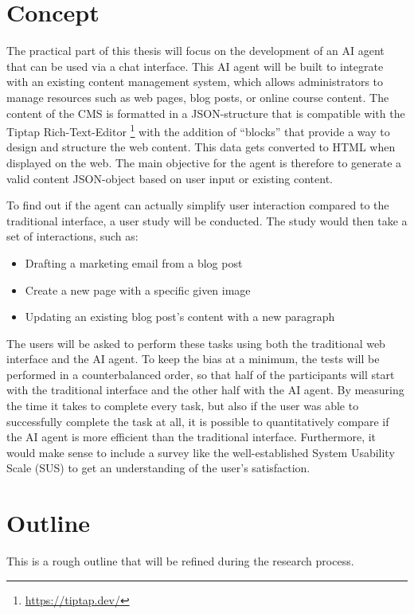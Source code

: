 \documentclass[12pt,a4paper]{article}
\begin{document}
\section*{Concept}
The practical part of this thesis will focus on the development of an AI agent that can be used via a chat interface.
This AI agent will be built to integrate with an existing content management system, which allows administrators to manage resources such as web pages, blog posts, or online course content.
The content of the CMS is formatted in a JSON-structure that is compatible with the Tiptap Rich-Text-Editor \footnote{\url{https://tiptap.dev/}} with the addition of “blocks” that provide a way to design and structure the web content.
This data gets converted to HTML when displayed on the web.
The main objective for the agent is therefore to generate a valid content JSON-object based on user input or existing content.

To find out if the agent can actually simplify user interaction compared to the traditional interface, a user study will be conducted. The study would then take a set of interactions, such as:

\begin{itemize}
	\item Drafting a marketing email from a blog post
	\item Create a new page with a specific given image
	\item Updating an existing blog post's content with a new paragraph
\end{itemize}

The users will be asked to perform these tasks using both the traditional web interface and the AI agent. To keep the bias at a minimum, the tests will be performed in a counterbalanced order, so that half of the participants will start with the traditional interface and the other half with the AI agent.
By measuring the time it takes to complete every task, but also if the user was able to successfully complete the task at all, it is possible to quantitatively compare if the AI agent is more efficient than the traditional interface.
Furthermore, it would make sense to include a survey like the well-established System Usability Scale (SUS) \autocite{brooke_sus_1995} to get an understanding of the user's satisfaction.

\section*{Outline}
This is a rough outline that will be refined during the research process.
\end{document}
